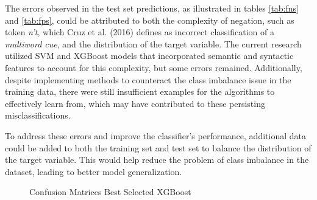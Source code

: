 The errors observed in the test set predictions, as illustrated in tables \ref{tab:fns} and \ref{tab:fps}, could be attributed to both the complexity of negation, such as token \textit{n't}, which Cruz et al. (2016) \cite{cruz2016machine} defines as incorrect classification of a \textit{multiword cue}, and the distribution of the target variable. The current research utilized SVM and XGBoost models that incorporated semantic and syntactic features to account for this complexity, but some errors remained. Additionally, despite implementing methods to counteract the class imbalance issue in the training data, there were still insufficient examples for the algorithms to effectively learn from, which may have contributed to these persisting misclassifications.

To address these errors and improve the classifier's performance, additional data could be added to both the training set and test set to balance the distribution of the target variable. This would help reduce the problem of class imbalance in the dataset, leading to better model generalization.

\begin{figure}[!h]
\centering
  \caption{Confusion Matrices Best Selected XGBoost}
  \label{fig:best_xgb}
\end{figure}

